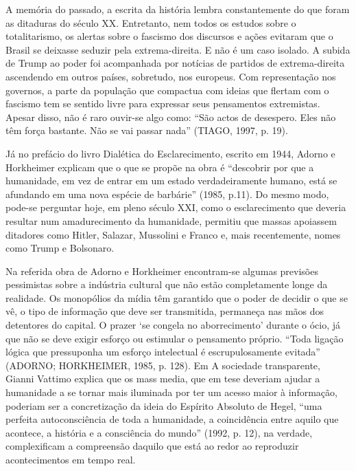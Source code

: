 \documentclass[../DISSERTACAO_MAIN.tex]{subfiles}
\begin{document}
A memória do passado, a escrita da história lembra constantemente do que foram as ditaduras do século XX. Entretanto, nem todos os estudos sobre o totalitarismo, os alertas sobre o fascismo dos discursos e ações evitaram que o Brasil se deixasse seduzir pela extrema-direita. E não é um caso isolado. A subida de Trump ao poder foi acompanhada por notícias de partidos de extrema-direita ascendendo em outros países, sobretudo, nos europeus. Com representação nos governos, a parte da população que compactua com ideias que flertam com o fascismo tem se sentido livre para expressar seus pensamentos extremistas. Apesar disso, não é raro ouvir-se algo como: “São actos de desespero. Eles não têm força bastante. Não se vai passar nada” (TIAGO, 1997, p. 19).

Já no prefácio do livro Dialética do Esclarecimento, escrito em 1944, Adorno e Horkheimer explicam que o que se propõe na obra é “descobrir por que a humanidade, em vez de entrar em um estado verdadeiramente humano, está se afundando em uma nova espécie de barbárie” (1985, p.11). Do mesmo modo, pode-se perguntar hoje, em pleno século XXI, como o esclarecimento que deveria resultar num amadurecimento da humanidade, permitiu que massas apoiassem ditadores como Hitler, Salazar, Mussolini e Franco e, mais recentemente, nomes como Trump e Bolsonaro.

Na referida obra de Adorno e Horkheimer encontram-se algumas previsões pessimistas sobre a indústria cultural que não estão completamente longe da realidade. Os monopólios da mídia têm garantido que o poder de decidir o que se vê, o tipo de informação que deve ser transmitida, permaneça nas mãos dos detentores do capital. O prazer ‘se congela no aborrecimento’ durante o ócio, já que não se deve exigir esforço ou estimular o pensamento próprio. “Toda ligação lógica que pressuponha um esforço intelectual é escrupulosamente evitada” (ADORNO; HORKHEIMER, 1985, p. 128). Em A sociedade transparente, Gianni Vattimo explica que os mass media, que em tese deveriam ajudar a humanidade a se tornar mais iluminada por ter um acesso maior à informação, poderiam ser a concretização da ideia do Espírito Absoluto de Hegel, “uma perfeita autoconsciência de toda a humanidade, a coincidência entre aquilo que acontece, a história e a consciência do mundo” (1992, p. 12), na verdade, complexificam a compreensão daquilo que está ao redor ao reproduzir acontecimentos em tempo real.
\end{document}
